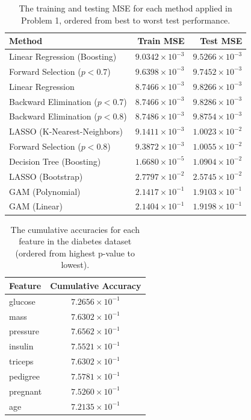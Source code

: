 \documentclass[twoside,twocolumn,10pt]{revtex4-1}
\begin{document}
	\begin{table}[H]
	\center
		\begin{tabular}{l r r}
		\textbf{Method} & \textbf{Train MSE} & \textbf{Test MSE}\\ 
		\hline
		Linear Regression (Boosting) & $9.0342 \times 10^{-3}$ & $9.5266 \times 10^{-3}$\\
		Forward Selection ($p < 0.7$) & $9.6398 \times 10^{-3}$ & $9.7452 \times 10^{-3}$\\
		Linear Regression & $8.7466 \times 10^{-3}$ & $9.8266 \times 10^{-3}$\\
		Backward Elimination ($p < 0.7$) & $8.7466 \times 10^{-3}$ & $9.8286 \times 10^{-3}$\\
		Backward Elimination ($p < 0.8$) & $8.7486 \times 10^{-3}$ & $9.8754 \times 10^{-3}$\\
		LASSO (K-Nearest-Neighbors) & $9.1411 \times 10^{-3}$ & $1.0023 \times 10^{-2}$\\
		Forward Selection ($p < 0.8$) & $9.3872 \times 10^{-3}$ & $1.0055 \times 10^{-2}$\\
		Decision Tree (Boosting) & $1.6680 \times 10^{-5}$ & $1.0904 \times 10^{-2}$ \\
		LASSO (Bootstrap) & $2.7797 \times 10^{-2}$ & $2.5745 \times 10^{-2}$ \\
		GAM (Polynomial) & $2.1417 \times 10^{-1}$ & $1.9103 \times 10^{-1}$\\
		GAM (Linear) & $2.1404 \times 10^{-1}$ & $1.9198 \times 10^{-1}$
		\end{tabular}
		\caption{The training and testing MSE for each method applied in Problem 1, ordered from best to worst test performance.\label{table_8}}
	\end{table}	

	\begin{table}[H]
	\center
		\begin{tabular}{l c}	
		\textbf{Feature} & \textbf{Cumulative Accuracy} \\
		\hline
		glucose & $7.2656 \times 10^{-1}$ \\
		mass & $7.6302 \times 10^{-1}$ \\
		pressure & $7.6562 \times 10^{-1}$ \\
		insulin & $7.5521 \times 10^{-1}$ \\
		triceps & $7.6302 \times 10^{-1}$ \\
		pedigree & $7.5781 \times 10^{-1}$ \\
		pregnant & $7.5260 \times 10^{-1}$ \\
		age & $7.2135 \times 10^{-1} $
		\end{tabular}
		\caption{The cumulative accuracies for each feature in the diabetes dataset (ordered from highest p-value to lowest).\label{table_9}}
	\end{table}
	
\end{document}

